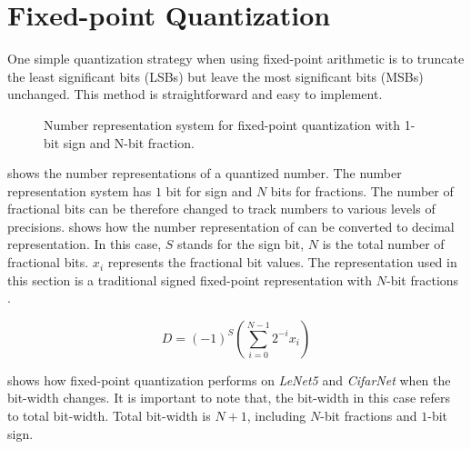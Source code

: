 \documentclass[a4paper,12pt]{report}
\begin{document}
\section{Fixed-point Quantization}
One simple quantization strategy when using fixed-point arithmetic is to truncate
the least significant bits (LSBs) but leave the most significant bits (MSBs)
unchanged.
This method is straightforward and easy to implement.
\begin{figure}[!h]
\centering
{}
\caption{Number representation system for fixed-point quantization with 1-bit
sign and N-bit fraction.}
\label{fig:number_rep_4bit}
\end{figure}

 shows the number representations of a quantized number.
The number representation system has $1$ bit for sign and
$N$ bits for fractions.
The number of fractional bits can be therefore changed to track numbers to various
levels of precisions.
 shows how the number representation of 
can be converted to decimal representation.
In this case, $S$ stands for the sign bit, $N$ is the total number
of fractional bits.
$x_i$ represents the fractional bit values.
The representation used in this section is a traditional signed fixed-point
representation with $N$-bit fractions \cite{ercegovac2004digital}.

\begin{equation}
    D = (-1)^S (\sum^{N-1}_{i=0}2^{-i}x_i)
    \label{equ:d2fp}
\end{equation}

 shows how fixed-point quantization performs on \textit{LeNet5}
and \textit{CifarNet} when the bit-width changes.
It is important to note that, the bit-width in this case refers to total bit-width.
Total bit-width is $N+1$, including $N$-bit fractions and $1$-bit sign.
\end{document}
